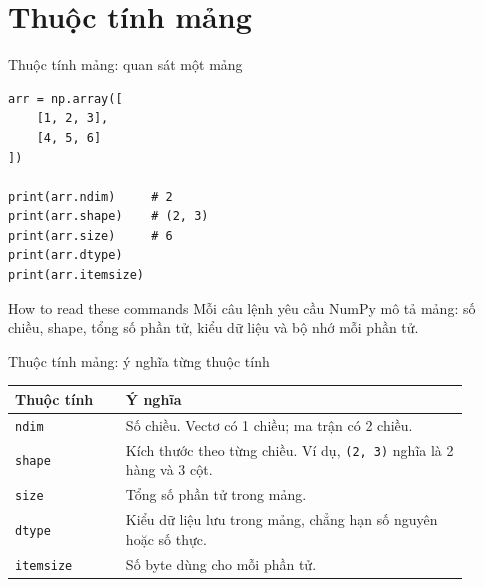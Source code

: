 \documentclass[aspectratio=169,11pt]{beamer}
\begin{document}
\section{Thuộc tính mảng}

\begin{frame}[fragile]{Thuộc tính mảng: quan sát một mảng}
\small
\begin{lstlisting}[style=py]
arr = np.array([
    [1, 2, 3],
    [4, 5, 6]
])

print(arr.ndim)     # 2
print(arr.shape)    # (2, 3)
print(arr.size)     # 6
print(arr.dtype)
print(arr.itemsize)
\end{lstlisting}
\begin{block}{How to read these commands}
Mỗi câu lệnh yêu cầu NumPy mô tả mảng: số chiều, shape, tổng số phần tử, kiểu dữ liệu và bộ nhớ mỗi phần tử.
\end{block}
\end{frame}

\begin{frame}{Thuộc tính mảng: ý nghĩa từng thuộc tính}
\small
\begin{tabular}{p{0.22\linewidth}p{0.68\linewidth}}
\toprule
\textbf{Thuộc tính} & \textbf{Ý nghĩa} \\
\midrule
\texttt{ndim} & Số chiều. Vectơ có 1 chiều; ma trận có 2 chiều. \\
\texttt{shape} & Kích thước theo từng chiều. Ví dụ, \texttt{(2, 3)} nghĩa là 2 hàng và 3 cột. \\
\texttt{size} & Tổng số phần tử trong mảng. \\
\texttt{dtype} & Kiểu dữ liệu lưu trong mảng, chẳng hạn số nguyên hoặc số thực. \\
\texttt{itemsize} & Số byte dùng cho mỗi phần tử. \\
\bottomrule
\end{tabular}
\end{frame}
\end{document}

